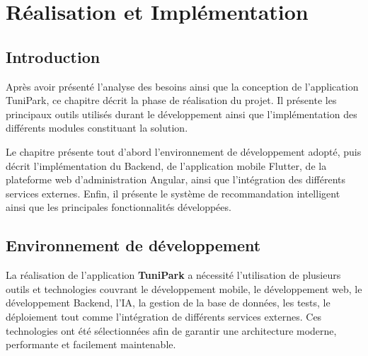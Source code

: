 \chapter{Réalisation et Implémentation}
\label{chap:implementation}

\section{Introduction}

\par Après avoir présenté l'analyse des besoins ainsi que la conception de l'application TuniPark, ce chapitre décrit la phase de réalisation du projet. Il présente les principaux outils utilisés durant le développement ainsi que l'implémentation des différents modules constituant la solution.

\par Le chapitre présente tout d'abord l'environnement de développement adopté, puis décrit l'implémentation du Backend, de l'application mobile Flutter, de la plateforme web d'administration Angular, ainsi que l'intégration des différents services externes. Enfin, il présente le système de recommandation intelligent ainsi que les principales fonctionnalités développées.


\section{Environnement de développement}

\par La réalisation de l'application \textbf{TuniPark} a nécessité l'utilisation de plusieurs outils et technologies couvrant le développement mobile, le développement web, le développement Backend, l'IA, la gestion de la base de données, les tests, le déploiement tout comme l'intégration de différents services externes. Ces technologies ont été sélectionnées afin de garantir une architecture moderne, performante et facilement maintenable.

